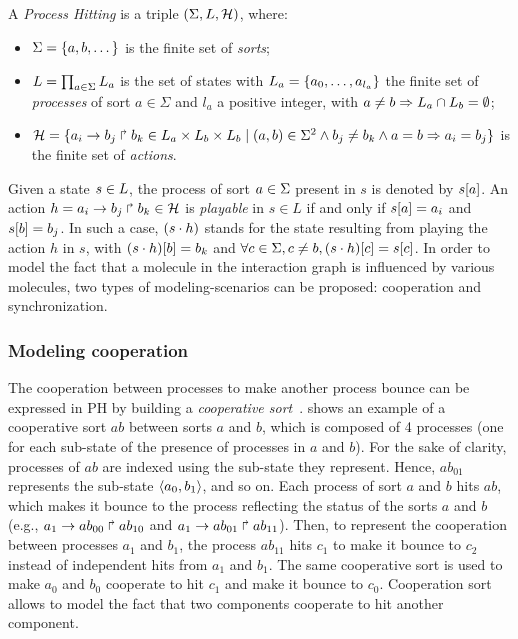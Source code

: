 \begin{definition} \label{def:PH}
A \emph{Process Hitting} is a triple $(\Sigma,L,\mathcal{H})$, where:
\begin{itemize}
\item $\Sigma = \{a,b,\dots\}$ is the finite set of \emph{sorts};
\item $L = \prod_{a\in\Sigma} L_a$ is the set of states with $L_a = \{a_0,\dots,a_{l_a}\}$
the finite set of \emph{processes} of sort $a\in\Sigma$ and $l_a$ a positive integer, with $a\neq b\Rightarrow L_a \cap L_b = \emptyset$;
\item $\mathcal{H} = \{ a_i\rightarrow b_j\Rsh b_k \in L_a \times L_b \times L_b \mid (a,b) \in \Sigma^2
  \wedge b_j\neq b_k \wedge a=b\Rightarrow a_i=b_j\}$ is the finite set of \emph{actions}.
\end{itemize}
\end{definition}

\noindent
Given a state $s\in L$, the process of sort $a\in\Sigma$ present in $s$ is denoted by ${s[a]}$.
An action $h=a_i\rightarrow b_j\Rsh b_k \in \mathcal{H}$ is \emph{playable} in $s \in L$ if and only if ${s[a]}=a_i$ and ${s[b]} = b_j$.
In such a case, $(s\cdot h)$ stands for the state resulting from playing the action $h$ in $s$, with
${(s\cdot h)[b]} = b_k$ and $\forall c \in \Sigma, c \neq b, {(s\cdot h)[c]} = {s[c]}$.
In order to model the fact that a molecule in the interaction graph is influenced by various molecules, two 
types of modeling-scenarios can be proposed: cooperation and synchronization.

\subsubsection{Modeling cooperation}

The cooperation between processes to make another process bounce can be
expressed in PH by building a \emph{cooperative sort}~\cite{PMR10-TCSB}.
 shows an example of a cooperative sort $ab$ between sorts $a$ and $b$,
which is composed of 4 processes (one for each sub-state of the presence of processes in $a$ and $b$).
For the sake of clarity, processes of $ab$ are indexed using the sub-state they represent.
Hence, $ab_{01}$ represents the sub-state $\langle a_0,b_1 \rangle$, and so on.
Each process of sort $a$ and $b$ hits $ab$, which makes it bounce to the process reflecting the status of the sorts $a$
and $b$ (e.g., $a_1\rightarrow ab_{00}\Rsh ab_{10}$ and $a_1\rightarrow ab_{01}\Rsh ab_{11}$).
Then, to represent the cooperation between processes $a_1$ and $b_1$,
the process $ab_{11}$ hits $c_1$ to make it bounce to $c_2$ instead of
independent hits from $a_1$ and $b_1$.
The same cooperative sort is used to make $a_0$ and $b_0$ cooperate to hit $c_1$ and make it bounce to $c_0$.
Cooperation sort allows to model the fact that two components cooperate to hit another component.
